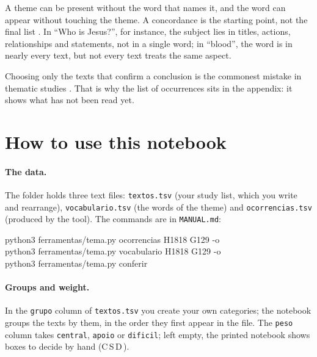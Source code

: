 \begin{alerta}
A theme can be present without the word that names it, and the word can appear
without touching the theme. A concordance is the starting point, not the final
list \parencite{barr1961, silva1994}. In \enquote{Who is Jesus?}, for
instance, the subject lies in titles, actions, relationships and statements,
not in a single word; in \enquote{blood}, the word is in nearly every text,
but not every text treats the same aspect.
\end{alerta}

\begin{alerta}
Choosing only the texts that confirm a conclusion is the commonest mistake in
thematic studies \parencite{carson1996}. That is why the list of occurrences
sits in the appendix: it shows what has not been read yet.
\end{alerta}

\section{How to use this notebook}

\paragraph{The data.} The folder \texttt{\temaDados} holds three text files:
\texttt{textos.tsv} (your study list, which you write and rearrange),
\texttt{vocabulario.tsv} (the words of the theme) and \texttt{ocorrencias.tsv}
(produced by the tool). The commands are in \texttt{MANUAL.md}:

\begin{nota}[Tools]
\small\ttfamily
python3 ferramentas/tema.py ocorrencias H1818 G129 -o \temaDados\\
python3 ferramentas/tema.py vocabulario H1818 G129 -o \temaDados\\
python3 ferramentas/tema.py conferir \temaDados
\end{nota}

\paragraph{Groups and weight.} In the \texttt{grupo} column of
\texttt{textos.tsv} you create your own categories; the notebook groups the
texts by them, in the order they first appear in the file. The \texttt{peso}
column takes \texttt{central}, \texttt{apoio} or \texttt{dificil}; left empty,
the printed notebook shows boxes to decide by hand
({\sffamily\tiny\color{suave}C\,\EBcaixa\;S\,\EBcaixa\;D\,\EBcaixa}).

